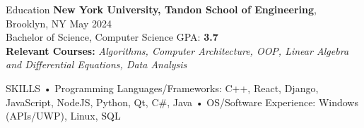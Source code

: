\documentclass{resume} %
\begin{document}

\begin{rSection}{Education}
    {\bf New York University, Tandon School of Engineering}, Brooklyn, NY \hfill {May 2024}\\
    Bachelor of Science, Computer Science \hfill GPA: {\bf 3.7} \medskip \\
    {\bf Relevant Courses:} {\emph {Algorithms, Computer Architecture, OOP, Linear Algebra and Differential Equations, Data Analysis}}
\end{rSection}


\begin{rSection}{SKILLS}
• Programming Languages/Frameworks: C++, React, Django, JavaScript, NodeJS, Python, Qt, C\#, Java \newline
• OS/Software Experience: Windows (APIs/UWP), Linux, SQL

\end{rSection}

\end{document}
